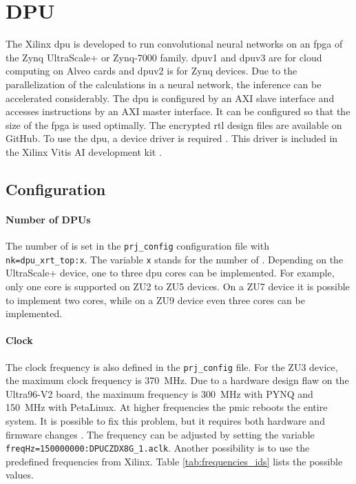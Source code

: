 \section{DPU}
\label{sec:embedded_platform:dpu}

The Xilinx \acrfull{dpu} is developed to run convolutional neural networks on an \acrshort{fpga} of the Zynq UltraScale+ or Zynq-7000 family.
\acrshort{dpu}v1 and \acrshort{dpu}v3 are for cloud computing on Alveo cards and \acrshort{dpu}v2 is for Zynq devices. 
Due to the parallelization of the calculations in a neural network, the inference can be accelerated considerably.
The \acrshort{dpu} is configured by an AXI slave interface and accesses instructions by an AXI master interface.
It can be configured so that the size of the \acrshort{fpga} is used optimally.
The encrypted \acrshort{rtl} design files are available on GitHub.
To use the \acrshort{dpu}, a device driver is required \cite{dpu_product_guide}.
This driver is included in the Xilinx Vitis AI development kit \cite{dpu_product_guide_v3_2}.

\subsection{Configuration}
\label{subsec:embedded_platform:dpu:configuration}
\paragraph{Number of DPUs}
The number of  is set in the \texttt{prj\_config} configuration file with \texttt{nk=dpu\_xrt\_top:x}.
The variable \texttt{x} stands for the number of .
Depending on the UltraScale+ device, one to three \acrshort{dpu} cores can be implemented.
For example, only one core is supported on ZU2 to ZU5 devices.
On a ZU7 device it is possible to implement two cores, while on a ZU9 device even three cores can be implemented.

\paragraph{Clock}
The clock frequency is also defined in the \texttt{prj\_config} file.
For the ZU3 device, the maximum clock frequency is \SI{370}{MHz}.
Due to a hardware design flaw on the Ultra96-V2 board, the maximum frequency is \SI{300}{MHz} with PYNQ and \SI{150}{MHz} with PetaLinux.
At higher frequencies the \acrfull{pmic} reboots the entire system.
It is possible to fix this problem, but it requires both hardware and firmware changes \cite{pmic_issue}.
The frequency can be adjusted by setting the variable \texttt{freqHz=150000000:DPUCZDX8G\_1.aclk}.
Another possibility is to use the predefined frequencies from Xilinx.
Table \ref{tab:frequencies_ids} lists the possible values.


